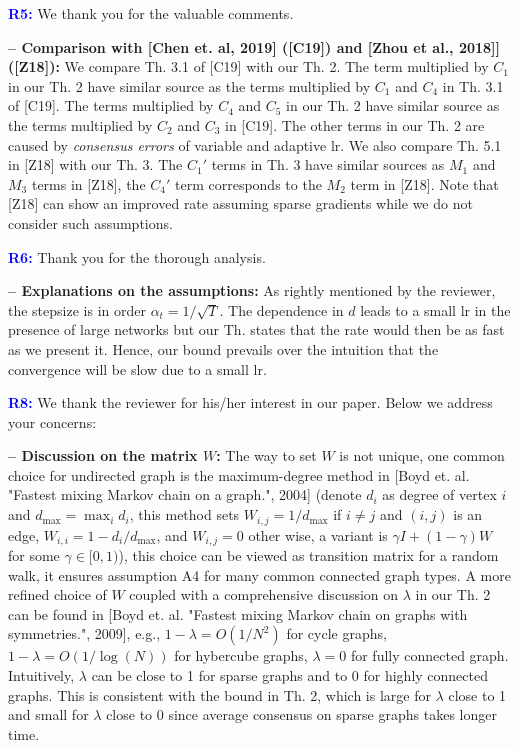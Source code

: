 \documentclass{article} %
\begin{document}
\vspace{-2pt}
\textcolor{blue}{\textbf{R5:}}
We thank you for the valuable comments. \vspace{-4pt}




\textbf{-- Comparison with [Chen et. al, 2019] ([C19]) and [Zhou et al., 2018]] ([Z18]):}
We compare Th. 3.1 of [C19] with our Th. 2. 
The term multiplied by $C_1$ in our Th. 2 have similar source as the terms multiplied by $C_1$ and $C_4$ in Th. 3.1 of [C19]. 
The terms multiplied by $C_4$ and $C_5$ in our Th. 2 have similar source as the terms multiplied by $C_2$ and $C_3$ in [C19]. 
The other terms in our Th. 2 are caused by \emph{consensus errors} of variable and adaptive lr. We also compare Th. 5.1 in [Z18] with our Th. 3. The $C_1'$ terms in Th. 3 have similar sources as $M_1$ and $M_3$ terms in [Z18], the $C_4'$ term corresponds to the $M_2$ term in [Z18]. 
Note that [Z18] can show an improved rate assuming sparse gradients while we do not consider such assumptions. 


\vspace{-2pt}
\textcolor{blue}{\textbf{R6:}}
Thank you for the thorough analysis. \vspace{-4pt}

\textbf{-- Explanations on the assumptions:}
As rightly mentioned by the reviewer, the stepsize is in order $\alpha_t = 1/\sqrt{T}$. 
The dependence in $d$ leads to a small lr in the presence of large networks but our Th. states that the rate would then be as fast as we present it. 
Hence, our bound prevails over the intuition that the convergence will be slow due to a small lr.

\vspace{-2pt}
\textcolor{blue}{\textbf{R8:}}
We thank the reviewer for his/her interest in our paper. Below we address your concerns: \vspace{-4pt}

\textbf{-- Discussion on the matrix $W$:}
The way to set $W$ is not unique, one common choice for undirected graph is the maximum-degree method in [Boyd et. al. "Fastest mixing Markov chain on a graph.", 2004] (denote $d_i$ as degree of vertex $i$ and $d_{\max} = \max_i d_i$, this method sets $W_{i,j} = 1/d_{\max}$ if $i\neq j$ and $(i,j)$ is an edge, $W_{i,i} = 1-d_i/d_{\max}$, and $W_{i,j} = 0$ other wise, a variant is $\gamma I + (1-\gamma) W$ for some $\gamma \in [0,1)$), this choice can be viewed as transition matrix for a random walk, it ensures assumption A4 for many common connected graph types.  
A more refined choice of $W$ coupled with a comprehensive discussion on $\lambda$ in our Th. 2 can be found in [Boyd et. al. "Fastest mixing Markov chain on graphs with symmetries.", 2009], e.g., $1-\lambda =O(1/N^2)$ for cycle graphs, $1-\lambda =O(1/\log(N))$ for hybercube graphs, $\lambda = 0$ for fully connected graph. 
Intuitively, $\lambda$ can be close to 1 for sparse graphs and to 0 for highly connected graphs. 
This is consistent with the bound in Th. 2, which is large for $\lambda$ close to 1 and small for $\lambda $ close to 0 since average consensus on sparse graphs takes longer time.

\end{document}
